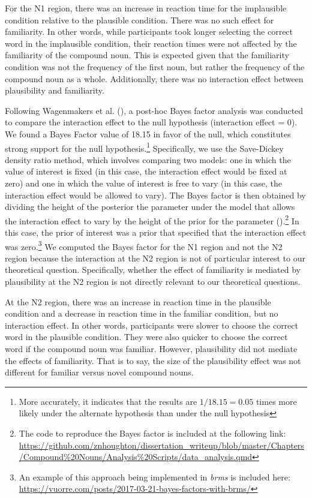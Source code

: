 \documentclass[
  12pt,
  letterpaper,
]{scrreprt}
\begin{document}
For the N1 region, there was an increase in reaction time for the
implausible condition relative to the plausible condition. There was no
such effect for familiarity. In other words, while participants took
longer selecting the correct word in the implausible condition, their
reaction times were not affected by the familiarity of the compound
noun. This is expected given that the familiarity condition was not the
frequency of the first noun, but rather the frequency of the compound
noun as a whole. Additionally, there was no interaction effect between
plausibility and familiarity.

Following Wagenmakers et al.
(), a
post-hoc Bayes factor analysis was conducted to compare the interaction
effect to the null hypothesis (interaction effect = 0). We found a Bayes
Factor value of 18.15 in favor of the null, which constitutes strong
support for the null hypothesis.\footnote{More accurately, it indicates
  that the results are \(1/18.15=0.05\) times more likely under the
  alternate hypothesis than under the null hypothesis} Specifically, we
use the Save-Dickey density ratio method, which involves comparing two
models: one in which the value of interest is fixed (in this case, the
interaction effect would be fixed at zero) and one in which the value of
interest is free to vary (in this case, the interaction effect would be
allowed to vary). The Bayes factor is then obtained by dividing the
height of the posterior the parameter under the model that allows the
interaction effect to vary by the height of the prior for the parameter
().\footnote{The code to reproduce the Bayes factor is included
  at the following link:
  \url{https://github.com/znhoughton/dissertation_writeup/blob/master/Chapters/Compound\%20Nouns/Analysis\%20Scripts/data_analysis.qmd}}
In this case, the prior of interest was a prior that specified that the
interaction effect was zero.\footnote{An example of this approach being
  implemented in \emph{brms} is included here:
  \url{https://vuorre.com/posts/2017-03-21-bayes-factors-with-brms/}} We
computed the Bayes factor for the N1 region and not the N2 region
because the interaction at the N2 region is not of particular interest
to our theoretical question. Specifically, whether the effect of
familiarity is mediated by plausibility at the N2 region is not directly
relevant to our theoretical questions.

At the N2 region, there was an increase in reaction time in the
plausible condition and a decrease in reaction time in the familiar
condition, but no interaction effect. In other words, participants were
slower to choose the correct word in the plausible condition. They were
also quicker to choose the correct word if the compound noun was
familiar. However, plausibility did not mediate the effects of
familiarity. That is to say, the size of the plausibility effect was not
different for familiar versus novel compound nouns.
\end{document}

